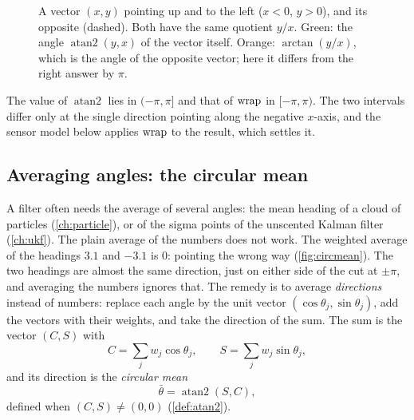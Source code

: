 \begin{figure}[ht]
\centering
{}
\caption{A vector $(x,y)$ pointing up and to the left ($x<0$, $y>0$), and
its opposite (dashed). Both have the same quotient $y/x$. Green: the angle
$\operatorname{atan2}(y,x)$ of the vector itself. Orange: $\arctan(y/x)$,
which is the angle of the opposite vector; here it differs from the right
answer by $\pi$.}
\label{fig:atan2}
\end{figure}

The value of $\operatorname{atan2}$ lies in $(-\pi,\pi]$ and that of
$\operatorname{wrap}$ in $[-\pi,\pi)$. The two intervals differ only at the single
direction pointing along the negative $x$-axis, and the sensor model below
applies $\operatorname{wrap}$ to the result, which settles it.

\subsection{Averaging angles: the circular mean}
\label{sec:circular}


A filter often needs the average of several angles: the mean heading of
a cloud of particles (\cref{ch:particle}), or of the sigma points of the
unscented Kalman filter (\cref{ch:ukf}). The plain average of the numbers
does not work. The weighted average of the headings $3.1$ and $-3.1$ is
$0$: pointing the wrong way (\cref{fig:circmean}). The two headings are almost the same
direction, just on either side of the cut at $\pm\pi$, and averaging the
numbers ignores that. The remedy is to average \emph{directions} instead
of numbers: replace each angle by the unit vector
$(\cos\theta_j,\sin\theta_j)$, add the vectors with their weights, and
take the direction of the sum. The sum is the vector $(C,S)$ with
\[
  C=\sum_jw_j\cos\theta_j,\qquad S=\sum_jw_j\sin\theta_j ,
\]
and its direction is the \emph{circular mean}
\[
  \bar\theta=\operatorname{atan2}(S,C),
\]
defined when $(C,S)\neq(0,0)$ (\cref{def:atan2}).

